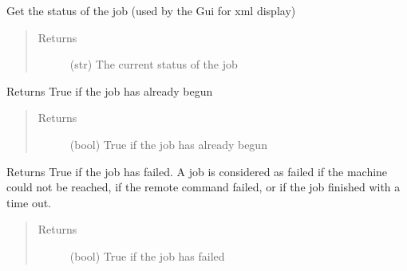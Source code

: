 \documentclass[a4paper,10pt,english]{sphinxmanual}
\begin{document}
\begin{fulllineitems}
\begin{fulllineitems}
\begin{quote}
\begin{description}
\end{description}\end{quote}

\end{fulllineitems}


\begin{fulllineitems}
\label{\detokenize{apidoc_commands/commands:commands.jobs.Job.get_status}}
Get the status of the job (used by the Gui for xml display)
\begin{quote}\begin{description}
\item[{Returns}] \leavevmode
(str) The current status of the job

\end{description}\end{quote}

\end{fulllineitems}


\begin{fulllineitems}
\label{\detokenize{apidoc_commands/commands:commands.jobs.Job.has_begun}}
Returns True if the job has already begun
\begin{quote}\begin{description}
\item[{Returns}] \leavevmode
(bool) True if the job has already begun

\end{description}\end{quote}

\end{fulllineitems}


\begin{fulllineitems}
\label{\detokenize{apidoc_commands/commands:commands.jobs.Job.has_failed}}
Returns True if the job has failed. 
A job is considered as failed if the machine could not be reached,
if the remote command failed, 
or if the job finished with a time out.
\begin{quote}\begin{description}
\item[{Returns}] \leavevmode
(bool) True if the job has failed


\end{description}
\end{quote}
\end{fulllineitems}
\end{fulllineitems}
\end{document}
